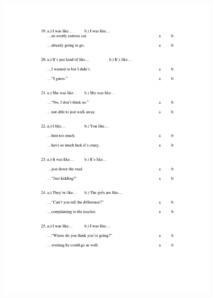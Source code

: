\begin{figure}[htbp]
	\centering
		\includegraphics[width=5in]{images/Exp1page4.pdf}
		\label{x1p4}
\end{figure}

